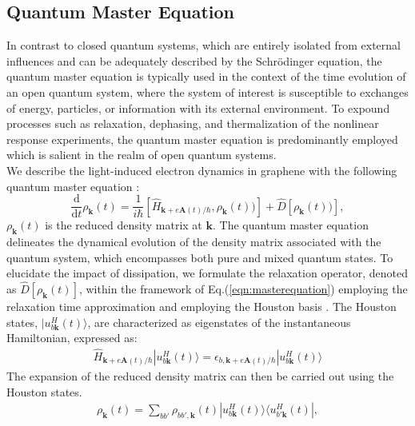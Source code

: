 \subsection{Quantum Master Equation \label{sec:master}}
In contrast to closed quantum systems, which are entirely isolated from external influences and can be adequately described by the Schrödinger equation, the quantum master equation is typically used in the context of the time evolution of an open quantum system, where the system of interest is susceptible to exchanges of energy, particles, or information with its external environment.
To expound processes such as relaxation, dephasing, and thermalization of the nonlinear response experiments, the quantum master equation is predominantly employed which is salient in the realm of open quantum systems.\\
We describe the light-induced electron dynamics in graphene with the following quantum master equation \cite{sato2019light,sato2019microscopic,sato2021high,sato2021nonlinear}:
\begin{equation}
	\frac{\mathrm{d}}{\mathrm{d}t}\rho_{\mathbf{k}}(t) = \frac{1}{i \hbar}	\left[ \hat{H}_{\mathbf{k}+e\mathbf{A}(t)/\hbar}, \rho_{\mathbf{k}} (t)) \right] +
	\hat{D}\left[ \rho_{\mathbf{k}} (t)) \right],
	\label{eqn:masterequation}
\end{equation}
$\rho_{\mathbf k}(t)$ is the reduced density matrix at $\mathbf k$. The quantum master equation delineates the dynamical evolution of the density matrix associated with the quantum system, which encompasses both pure and mixed quantum states.
To elucidate the impact of dissipation, we formulate the relaxation operator, denoted as
$\hat{D}\left[\rho_{\mathbf{k}} (t)\right]$, within the framework of Eq.(\ref{eqn:masterequation})
employing the relaxation time approximation\cite{meier1994coherent} and employing the Houston basis
\cite{PhysRev.57.184, PhysRevB.33.5494}. The Houston states, $|u^H_{b\mathbf k}(t)\rangle $,  are characterized as eigenstates of the instantaneous Hamiltonian, expressed as:
\begin{align}
	\hat{H}_{\mathbf{k}+e\mathbf{A}(t)/\hbar} |u^H_{b\mathbf k}(t)\rangle = \epsilon_{b,\mathbf k + e\mathbf A(t)/\hbar}|u^H_{b\mathbf k}(t)\rangle
	\label{eqn:Houston}
\end{align}
The expansion of the reduced density matrix can then be carried out using the Houston states.
\begin{align}
	\rho_{\mathbf k}(t) = \sum_{bb'}\rho_{bb',\mathbf k}(t)|u^H_{b\mathbf k}(t)\rangle \langle u^H_{b'\mathbf k}(t)|,
\end{align}
